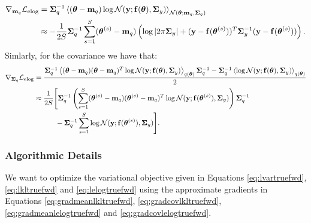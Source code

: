 \begin{align}
	\gradient_{\mq} \lelog  &= \Sigmaq^{-1} \Eb{ (\vectheta - \mq) \log \Normal(\vecy; \ftheta, \Sigmay) }_{\Normal(\vectheta; \mq, \Sigmaq)} \\
\label{eq:gradmeanlelogtruefwd}	
	& \approx  - \frac{1}{2S} \Sigmaq^{-1} \sum_{s=1}^{S}  (\thetas - \mq) \left( \log \det{2 \pi \Sigmay} +  (\vecy - \fthetas)^{T}\Sigmay^{-1}  (\vecy - \fthetas) \right) \text{.}
\end{align}
Simlarly, for the covariance we have that:
\begin{align}
	\gradient_{\Sigmaq} \lelog &=
	\frac{       \Sigmaq^{-1} \Eb{(\vectheta - \mq) (\vectheta-\mq)^{T} \log \Normal(\vecy; \ftheta, \Sigmay)}_{q(\vectheta)}  \Sigmaq^{-1}    -  \Sigmaq^{-1}  \Eb{  \log \Normal(\vecy; \ftheta, \Sigmay) }_{q(\vectheta)}  }{2} \\
\label{eq:gradcovlelogtruefwd}		
& \approx \frac{1}{2S} \Bigg[  
\Sigmaq^{-1} \left( \sum_{s=1}^{S} (\thetas - \mq) (\thetas-\mq)^{T} \log \Normal(\vecy; \fthetas, \Sigmay) \right)\Sigmaq^{-1}  \\
\nonumber
&	\quad \qquad - \Sigmaq^{-1} \sum_{s=1}^{S} \log \Normal(\vecy; \fthetas, \Sigmay) \Bigg] \text{.}
\end{align}
%
\subsubsection{Algorithmic Details}
We want to optimize the variational objective given in Equations \eqref{eq:lvartruefwd}, \eqref{eq:lkltruefwd}  and \eqref{eq:lelogtruefwd} using
the approximate gradients in Equations \eqref{eq:gradmeanlkltruefwd}, \eqref{eq:gradcovlkltruefwd}, \eqref{eq:gradmeanlelogtruefwd} and \eqref{eq:gradcovlelogtruefwd}.
%
